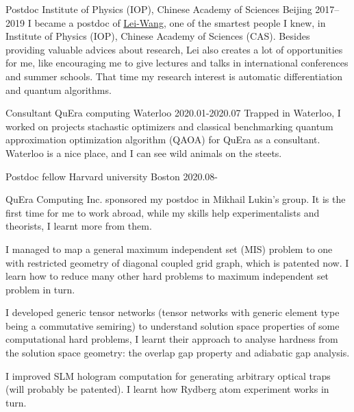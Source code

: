 \documentclass[11pt, a4paper]{awesome-cv}
\begin{document}
\begin{cvskills}
\end{cvskills}
\begin{cventries}
  \cventry
    {Postdoc}
    {Institute of Physics (IOP), Chinese Academy of Sciences}
    {Beijing}
    {2017--2019}
    {
        I became a postdoc of \href{http://wangleiphy.github.io/}{Lei-Wang}, one of the smartest people I knew, in Institute of Physics (IOP), Chinese Academy of Sciences (CAS). Besides providing valuable advices about research, Lei also creates a lot of opportunities for me, like encouraging me to give lectures and talks in international conferences and summer schools.
That time my research interest is automatic differentiation and quantum algorithms.
    }

  \cventry
    {Consultant}
    {QuEra computing}
    {Waterloo}
    {2020.01-2020.07}  %
    {
        Trapped in Waterloo, I worked on projects stachastic optimizers and classical benchmarking quantum approximation optimization algorithm (QAOA) for QuEra as a consultant. Waterloo is a nice place, and I can see wild animals on the steets.
    }

  \cventry
    {Postdoc fellow}
    {Harvard university}
    {Boston}
    {2020.08-}  %
    {
    QuEra Computing Inc. sponsored my postdoc in Mikhail Lukin's group.
    It is the first time for me to work abroad, while my skills help experimentalists and theorists, I learnt more from them.
    \vspace{2em}
\begin{cvitems}
\item I managed to map a general maximum independent set (MIS) problem to one with restricted geometry of diagonal coupled grid graph, which is patented now. I learn how to reduce many other hard problems to maximum independent set problem in turn.
\item I developed generic tensor networks (tensor networks with generic element type being a commutative semiring) to understand solution space properties of some computational hard problems, I learnt their approach to analyse hardness from the solution space geometry: the overlap gap property and adiabatic gap analysis.
\item I improved SLM hologram computation for generating arbitrary optical traps (will probably be patented). I learnt how Rydberg atom experiment works in turn.
    \end{cvitems}}
\end{cventries}
\end{document}
